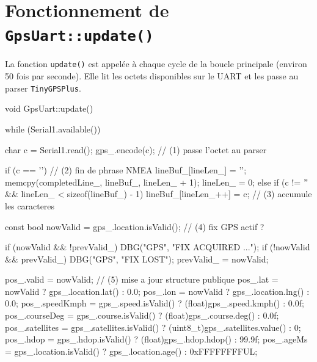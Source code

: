\documentclass[12pt,a4paper]{article}
\newcommand{\code}[1]{\texttt{#1}}
\begin{document}
\section{Fonctionnement de \texttt{GpsUart::update()}}

La fonction \code{update()} est appel\'ee \`a chaque cycle de la boucle
principale (environ 50 fois par seconde). Elle lit les octets disponibles
sur le UART et les passe au parser \code{TinyGPSPlus}.

\begin{cppbox}
void GpsUart::update() {
    while (Serial1.available()) {
        char c = Serial1.read();
        gps_.encode(c);               // (1) passe l'octet au parser

        if (c == '\n') {              // (2) fin de phrase NMEA
            lineBuf_[lineLen_] = '\0';
            memcpy(completedLine_, lineBuf_, lineLen_ + 1);
            lineLen_ = 0;
        } else if (c != '\r' && lineLen_ < sizeof(lineBuf_) - 1) {
            lineBuf_[lineLen_++] = c; // (3) accumule les caracteres
        }
    }

    const bool nowValid = gps_.location.isValid(); // (4) fix GPS actif ?

    if (nowValid && !prevValid_) { DBG("GPS", "FIX ACQUIRED ..."); }
    if (!nowValid && prevValid_) { DBG("GPS", "FIX LOST"); }
    prevValid_ = nowValid;

    pos_.valid      = nowValid;       // (5) mise a jour structure publique
    pos_.lat        = nowValid ? gps_.location.lat()  : 0.0;
    pos_.lon        = nowValid ? gps_.location.lng()  : 0.0;
    pos_.speedKmph  = gps_.speed.isValid()
                        ? (float)gps_.speed.kmph()  : 0.0f;
    pos_.courseDeg  = gps_.course.isValid()
                        ? (float)gps_.course.deg()  : 0.0f;
    pos_.satellites = gps_.satellites.isValid()
                        ? (uint8_t)gps_.satellites.value() : 0;
    pos_.hdop       = gps_.hdop.isValid()
                        ? (float)gps_.hdop.hdop()   : 99.9f;
    pos_.ageMs      = gps_.location.isValid()
                        ? gps_.location.age() : 0xFFFFFFFFUL;
}
\end{cppbox}
\end{document}
